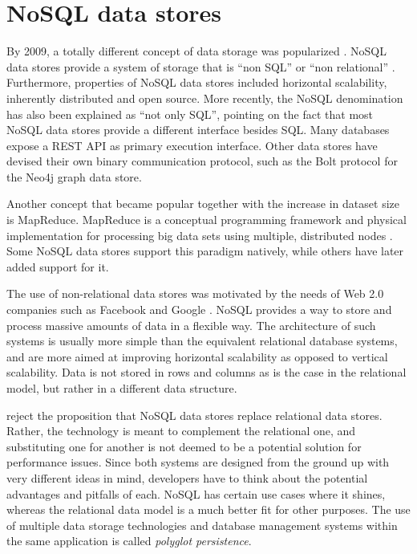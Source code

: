 \section{NoSQL data stores}
\label{sec:nosql-data-stores}

By 2009, a totally different concept of data storage was popularized \autocite{Leavitt2010}.
NoSQL data stores provide a system of storage that is ``non SQL'' or ``non relational'' \autocite{NoSQL2018}.
Furthermore, properties of NoSQL data stores included horizontal scalability, inherently distributed and open source.
More recently, the NoSQL denomination has also been explained as ``not only SQL'', pointing on the fact that most NoSQL data stores provide a different interface besides SQL.
Many databases expose a REST API as primary execution interface.
Other data stores have devised their own binary communication protocol, such as the Bolt protocol \autocite{Bolt2015} for the Neo4j graph data store.

Another concept that became popular together with the increase in dataset size is MapReduce.
MapReduce is a conceptual programming framework and physical implementation for processing big data sets using multiple, distributed nodes \autocite{Dean2008}.
Some NoSQL data stores support this paradigm natively, while others have later added support for it.

The use of non-relational data stores was motivated by the needs of Web 2.0 companies such as Facebook and Google \autocite{Mohan2013}.
NoSQL provides a way to store and process massive amounts of data in a flexible way.
The architecture of such systems is usually more simple than the equivalent relational database systems, and are more aimed at improving horizontal scalability as opposed to vertical scalability.
Data is not stored in rows and columns as is the case in the relational model, but rather in a different data structure.

\textcite{Sadalage2012} reject the proposition that NoSQL data stores replace relational data stores.
Rather, the technology is meant to complement the relational one, and substituting one for another is not deemed to be a potential solution for performance issues.
Since both systems are designed from the ground up with very different ideas in mind, developers have to think about the potential advantages and pitfalls of each.
NoSQL has certain use cases where it shines, whereas the relational data model is a much better fit for other purposes.
The use of multiple data storage technologies and database management systems within the same application is called \textit{polyglot persistence}.

